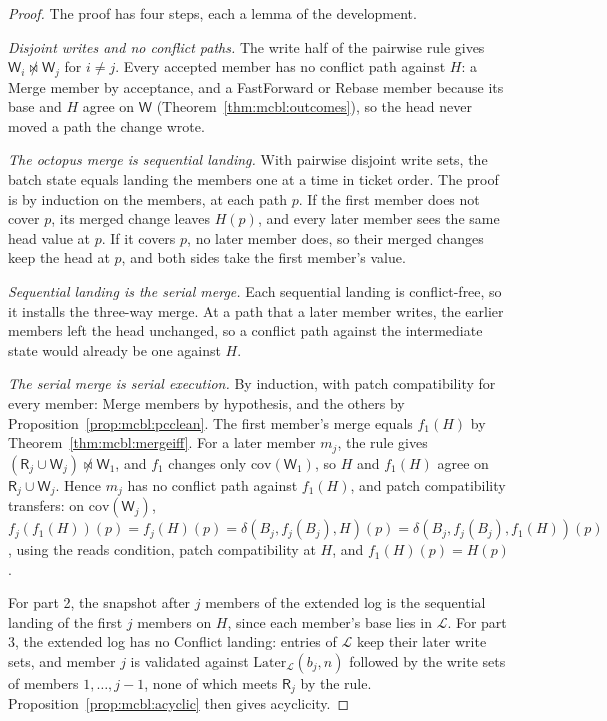 \documentclass[11pt,letterpaper]{article}
\theoremstyle{definition}
\theoremstyle{remark}
\newcommand{\R}{\mathsf{R}}
\newcommand{\W}{\mathsf{W}}
\newcommand{\Log}{\mathcal{L}}
\newcommand{\nmeets}{\not\bowtie}
\newcommand{\Later}{\mathrm{Later}}
\newcommand{\op}[1]{\mathrm{#1}}
\newcommand{\covd}{\op{cov}}
\begin{document}
\begin{proof}
The proof has four steps, each a lemma of the development.

\emph{Disjoint writes and no conflict paths.} The write half of the pairwise rule gives $\W_i\nmeets\W_j$ for $i\neq j$. Every accepted member has no conflict path against $H$: a Merge member by acceptance, and a FastForward or Rebase member because its base and $H$ agree on $\W$ (Theorem~\ref{thm:mcbl:outcomes}), so the head never moved a path the change wrote.

\emph{The octopus merge is sequential landing.} With pairwise disjoint write sets, the batch state equals landing the members one at a time in ticket order. The proof is by induction on the members, at each path $p$. If the first member does not cover $p$, its merged change leaves $H(p)$, and every later member sees the same head value at $p$. If it covers $p$, no later member does, so their merged changes keep the head at $p$, and both sides take the first member's value.

\emph{Sequential landing is the serial merge.} Each sequential landing is conflict-free, so it installs the three-way merge. At a path that a later member writes, the earlier members left the head unchanged, so a conflict path against the intermediate state would already be one against $H$.

\emph{The serial merge is serial execution.} By induction, with patch compatibility for every member: Merge members by hypothesis, and the others by Proposition~\ref{prop:mcbl:pcclean}. The first member's merge equals $f_1(H)$ by Theorem~\ref{thm:mcbl:mergeiff}. For a later member $m_j$, the rule gives $(\R_j\cup\W_j)\nmeets\W_1$, and $f_1$ changes only $\covd(\W_1)$, so $H$ and $f_1(H)$ agree on $\R_j\cup\W_j$. Hence $m_j$ has no conflict path against $f_1(H)$, and patch compatibility transfers: on $\covd(\W_j)$, $f_j(f_1(H))(p)=f_j(H)(p)=\delta(B_j,f_j(B_j),H)(p)=\delta(B_j,f_j(B_j),f_1(H))(p)$, using the reads condition, patch compatibility at $H$, and $f_1(H)(p)=H(p)$.

For part 2, the snapshot after $j$ members of the extended log is the sequential landing of the first $j$ members on $H$, since each member's base lies in $\Log$. For part 3, the extended log has no Conflict landing: entries of $\Log$ keep their later write sets, and member $j$ is validated against $\Later_{\Log}(b_j,n)$ followed by the write sets of members $1,\dots,j-1$, none of which meets $\R_j$ by the rule. Proposition~\ref{prop:mcbl:acyclic} then gives acyclicity.
\end{proof}
\end{document}
